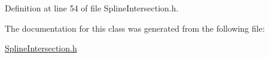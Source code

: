 Definition at line 54 of file Spline\+Intersection.\+h.



The documentation for this class was generated from the following file\+:\begin{DoxyCompactItemize}
\item 
\hyperlink{_spline_intersection_8h}{Spline\+Intersection.\+h}\end{DoxyCompactItemize}
